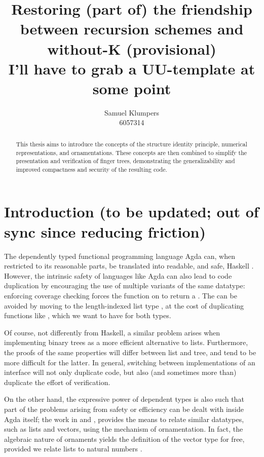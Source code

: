 \documentclass{article}
\title{Restoring (part of) the friendship between recursion schemes and without-K (provisional)\\ \small I'll have to grab a UU-template at some point}
\author{Samuel Klumpers\\6057314}
\theoremstyle{plain}%
\theoremstyle{definition}
\begin{document}
\maketitle
\tableofcontents

\newpage

\begin{abstract} %
    This thesis aims to introduce the concepts of the structure identity principle, numerical representations, and ornamentations. These concepts are then combined to simplify the presentation and verification of finger trees, demonstrating the generalizability and improved compactness and security of the resulting code. 
\end{abstract}

\section{Introduction (to be updated; out of sync since reducing friction)}\label{sec:intro}
The dependently typed functional programming language Agda \cite{agda} can, when restricted to its reasonable parts, be translated into readable, and safe, Haskell . However, the intrinsic safety of languages like Agda can also lead to code duplication by encouraging the use of multiple variants of the same datatype: enforcing coverage checking forces the  function on  to return a . The  can be avoided by moving to the length-indexed list type , at the cost of duplicating functions like \AgdaFunction{\_++\_}, which we want to have for both types.

Of course, not differently from Haskell, a similar problem arises when implementing binary trees as a more efficient alternative to lists. Furthermore, the proofs of the same properties will differ between list and tree, and tend to be more difficult for the latter. In general, switching between implementations of an interface will not only duplicate code, but also (and sometimes more than) duplicate the effort of verification.

On the other hand, the expressive power of dependent types is also such that part of the problems arising from safety or efficiency can be dealt with inside Agda itself; the work in \cite{orntrans} and \cite{progorn}, provides the means to relate similar datatypes, such as lists and vectors, using the mechanism of ornamentation. %
In fact, the algebraic nature of ornaments yields the definition of the vector type for free, provided we relate lists to natural numbers \cite{algorn}. %
\end{document}
